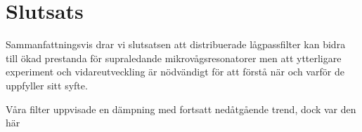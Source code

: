 \documentclass[main.tex]{subfiles}
\begin{document}
\section{Slutsats}
Sammanfattningsvis drar vi slutsatsen att distribuerade lågpassfilter kan bidra till ökad prestanda för supraledande mikrovågsresonatorer men att ytterligare experiment och vidareutveckling är nödvändigt för att förstå när och varför de uppfyller sitt syfte. 


Våra filter uppvisade en dämpning med fortsatt nedåtgående trend, dock var den här 
\end{document}

